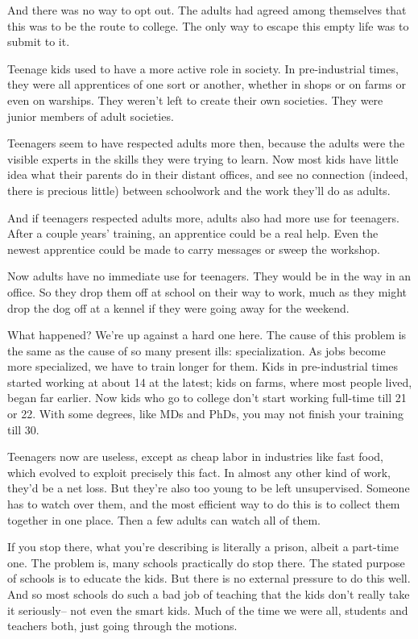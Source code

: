 And there was no way to opt out. The adults had agreed among themselves
that this was to be the route to college. The only way to escape this
empty life was to submit to it.

Teenage kids used to have a more active role in society. In
pre-industrial times, they were all apprentices of one sort or another,
whether in shops or on farms or even on warships. They weren't left to
create their own societies. They were junior members of adult societies.

Teenagers seem to have respected adults more then, because the adults
were the visible experts in the skills they were trying to learn. Now
most kids have little idea what their parents do in their distant
offices, and see no connection (indeed, there is precious little)
between schoolwork and the work they'll do as adults.

And if teenagers respected adults more, adults also had more use for
teenagers. After a couple years' training, an apprentice could be a real
help. Even the newest apprentice could be made to carry messages or
sweep the workshop.

Now adults have no immediate use for teenagers. They would be in the way
in an office. So they drop them off at school on their way to work, much
as they might drop the dog off at a kennel if they were going away for
the weekend.

What happened? We're up against a hard one here. The cause of this
problem is the same as the cause of so many present ills:
specialization. As jobs become more specialized, we have to train longer
for them. Kids in pre-industrial times started working at about 14 at
the latest; kids on farms, where most people lived, began far earlier.
Now kids who go to college don't start working full-time till 21 or 22.
With some degrees, like MDs and PhDs, you may not finish your training
till 30.

Teenagers now are useless, except as cheap labor in industries like fast
food, which evolved to exploit precisely this fact. In almost any other
kind of work, they'd be a net loss. But they're also too young to be
left unsupervised. Someone has to watch over them, and the most
efficient way to do this is to collect them together in one place. Then
a few adults can watch all of them.

If you stop there, what you're describing is literally a prison, albeit
a part-time one. The problem is, many schools practically do stop there.
The stated purpose of schools is to educate the kids. But there is no
external pressure to do this well. And so most schools do such a bad job
of teaching that the kids don't really take it seriously-- not even the
smart kids. Much of the time we were all, students and teachers both,
just going through the motions.

